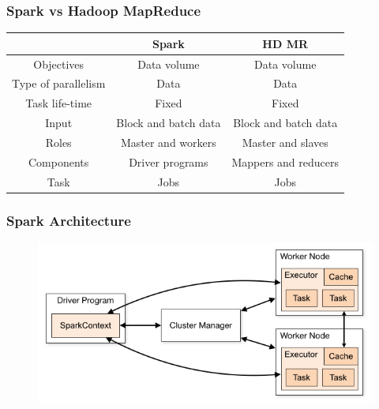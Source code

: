 \documentclass{beamer}
\begin{document}
\begin{frame}
\frametitle{Spark vs Hadoop MapReduce}

\begin{tabular}{|c|c|c|} \hline
 & Spark & HD MR \\ \hline \hline 
Objectives & Data volume & Data volume \\ \hline 
Type of parallelism & Data & Data \\ \hline 
Task life-time  & Fixed & Fixed \\  \hline 
Input  & Block and batch data  & Block and batch data \\ \hline 
Roles & Master and workers & Master and slaves \\  \hline 
Components & Driver programs & Mappers and reducers \\ \hline 
Task  & Jobs & Jobs \\ \hline
\end{tabular}
\end{frame}
\begin{frame}[fragile]
\frametitle{Spark Architecture}

\begin{figure}[!htb]
\centering
\includegraphics[scale=0.5]{pic/spark.png}
\end{figure}

\end{frame}
\end{document}
